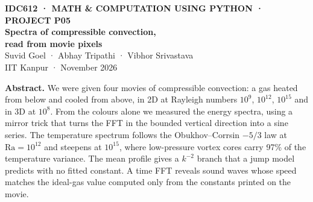 \documentclass[11pt,a4paper]{article}
\begin{document}
\setlength{\abovedisplayskip}{5pt}\setlength{\belowdisplayskip}{5pt}\setlength{\abovedisplayshortskip}{3pt}\setlength{\belowdisplayshortskip}{3pt}
\thispagestyle{empty}
\begin{tcolorbox}[enhanced,colback=ink,colframe=ink,arc=4pt,left=16pt,right=16pt,top=14pt,bottom=14pt]
{\sffamily\color{orange}\small\bfseries IDC612 · MATH \& COMPUTATION USING PYTHON · PROJECT P05}\\[6pt]
{\sffamily\color{white}\fontsize{24}{28}\selectfont\bfseries Spectra of compressible convection,\\ read from movie pixels}\\[10pt]
{\sffamily\color{white!80!ink}\normalsize Suvid Goel \;·\; Abhay Tripathi \;·\; Vibhor Srivastava}\\[2pt]
{\sffamily\color{white!65!ink}\small IIT Kanpur \;· November 2026}
\end{tcolorbox}

\begin{keybox}
\textbf{Abstract.} We were given four movies of compressible convection: a gas heated from below and cooled from above, in 2D at Rayleigh numbers $10^{9}$, $10^{12}$, $10^{15}$ and in 3D at $10^{8}$. From the colours alone we measured the energy spectra, using a mirror trick that turns the FFT in the bounded vertical direction into a sine series. The temperature spectrum follows the Obukhov--Corrsin $-5/3$ law at $\mathrm{Ra}=10^{12}$ and steepens at $10^{15}$, where low-pressure vortex cores carry 97\% of the temperature variance. The mean profile gives a $k^{-2}$ branch that a jump model predicts with no fitted constant. A time FFT reveals sound waves whose speed matches the ideal-gas value computed only from the constants printed on the movie.
\end{keybox}
\end{document}
